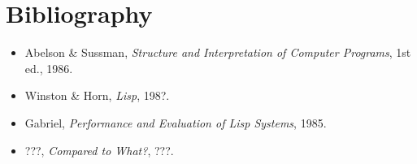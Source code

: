 \documentclass[12pt,openright,draft]{book}
\begin{document}

\backmatter{}
\chapter{Bibliography}

\begin{itemize}

\item Abelson \& Sussman, \emph{Structure and Interpretation of Computer Programs}, 1st ed., 1986.

\item Winston \& Horn, \emph{Lisp}, 198?.

\item Gabriel, \emph{Performance and Evaluation of Lisp Systems}, 1985.

\item ???, \emph{Compared to What?}, ???.

\end{itemize}
\end{document}
